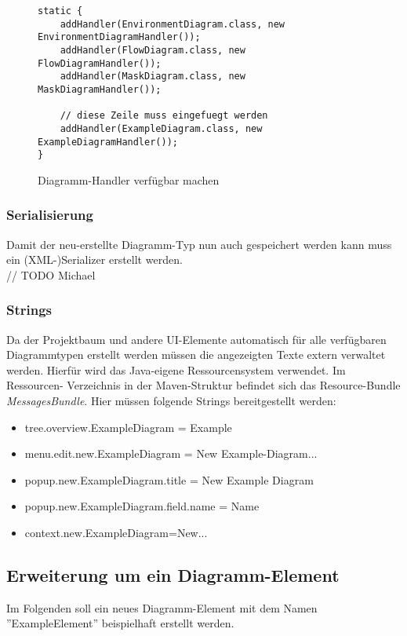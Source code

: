 \begin{figure}[h!]
	\centering
	\begin{lstlisting}
static {
    addHandler(EnvironmentDiagram.class, new EnvironmentDiagramHandler());
    addHandler(FlowDiagram.class, new FlowDiagramHandler());
    addHandler(MaskDiagram.class, new MaskDiagramHandler());
        
    // diese Zeile muss eingefuegt werden
    addHandler(ExampleDiagram.class, new ExampleDiagramHandler());
}
	\end{lstlisting}
	\label{diagram_handler}
	\caption{Diagramm-Handler verfügbar machen}
\end{figure}
\subsubsection{Serialisierung}
Damit der neu-erstellte Diagramm-Typ nun auch gespeichert werden kann muss ein (XML-)Serializer erstellt werden.
\\
// TODO Michael

\subsubsection{Strings}
Da der Projektbaum und andere UI-Elemente automatisch für alle verfügbaren Diagrammtypen erstellt werden müssen
die angezeigten Texte extern verwaltet werden. Hierfür wird das Java-eigene Ressourcensystem verwendet. Im Ressourcen-
Verzeichnis in der Maven-Struktur befindet sich das Resource-Bundle \textit{MessagesBundle}. Hier müssen folgende Strings
bereitgestellt werden:

\begin{itemize}
	\item tree.overview.ExampleDiagram = Example
	\item menu.edit.new.ExampleDiagram = New Example-Diagram...
	\item popup.new.ExampleDiagram.title = New Example Diagram
	\item popup.new.ExampleDiagram.field.name = Name
	\item context.new.ExampleDiagram=New...
\end{itemize}

\pagebreak
\subsection{Erweiterung um ein Diagramm-Element}
\label{add_element}
Im Folgenden soll ein neues Diagramm-Element mit dem Namen ''ExampleElement'' beispielhaft erstellt werden.

